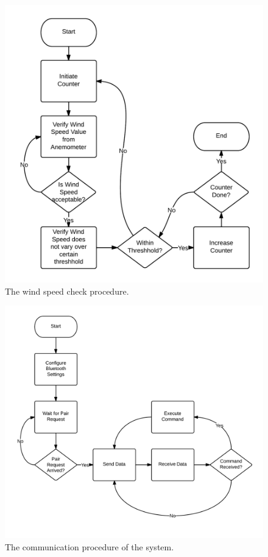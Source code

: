 	\begin{figure}[H]
		\centering
			\includegraphics[scale=0.25]{img/flowchart-windspeedcheck}
		\caption{The wind speed check procedure.}
	\end{figure}
	\begin{figure}[H]
		\centering
			\includegraphics[scale=0.25]{img/flowchart-communication-bluetooth}
		\caption{The communication procedure of the system.}
	\end{figure}

\newpage